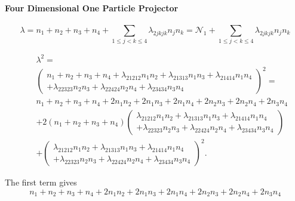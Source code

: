 \documentclass[12pt]{article}
\begin{document}
\paragraph{Four Dimensional One Particle Projector}

\begin{equation*}
\lambda =n_{1}+n_{2}+n_{3}+n_{4}+\sum_{1\leq j<k\leq 4}\lambda
_{2jkjk}n_{j}n_{k}=\mathcal{N}_{1}+\sum_{1\leq j<k\leq 4}\lambda
_{2jkjk}n_{j}n_{k}
\end{equation*}

\begin{eqnarray*}
&&\lambda ^{2}= \\
&&\left( 
\begin{array}{c}
n_{1}+n_{2}+n_{3}+n_{4}+\lambda _{21212}n_{1}n_{2}+\lambda
_{21313}n_{1}n_{3}+\lambda _{21414}n_{1}n_{4} \\ 
+\lambda _{22323}n_{2}n_{3}+\lambda _{22424}n_{2}n_{4}+\lambda
_{23434}n_{3}n_{4}%
\end{array}%
\right) ^{2}= \\
&&n_{1}+n_{2}+n_{3}+n_{4}+2n_{1}n_{2}+2n_{1}n_{3}+2n_{1}n_{4}+2n_{2}n_{3}+2n_{2}n_{4}+2n_{3}n_{4}
\\
&&+2\left( n_{1}+n_{2}+n_{3}+n_{4}\right) \left( 
\begin{array}{c}
\lambda _{21212}n_{1}n_{2}+\lambda _{21313}n_{1}n_{3}+\lambda
_{21414}n_{1}n_{4} \\ 
+\lambda _{22323}n_{2}n_{3}+\lambda _{22424}n_{2}n_{4}+\lambda
_{23434}n_{3}n_{4}%
\end{array}%
\right) \\
&&+\left( 
\begin{array}{c}
\lambda _{21212}n_{1}n_{2}+\lambda _{21313}n_{1}n_{3}+\lambda
_{21414}n_{1}n_{4} \\ 
+\lambda _{22323}n_{2}n_{3}+\lambda _{22424}n_{2}n_{4}+\lambda
_{23434}n_{3}n_{4}%
\end{array}%
\right) ^{2}.
\end{eqnarray*}

\bigskip The first term gives%
\begin{equation}
n_{1}+n_{2}+n_{3}+n_{4}+2n_{1}n_{2}+2n_{1}n_{3}+2n_{1}n_{4}+2n_{2}n_{3}+2n_{2}n_{4}+2n_{3}n_{4}
\end{equation}
\end{document}

